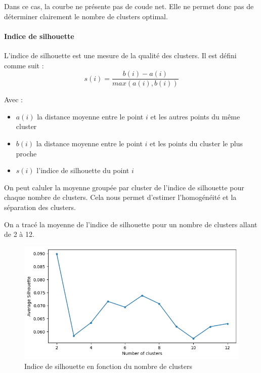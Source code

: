 \documentclass[french,a4paper,18pt]{article}
\begin{document}
Dans ce cas, la courbe ne présente pas de coude net. Elle ne permet donc pas de déterminer clairement le nombre de clusters optimal.

\paragraph{Indice de silhouette}

L'indice de silhouette est une mesure de la qualité des clusters.
Il est défini comme suit :
\begin{equation}
    s(i) = \frac{b(i) - a(i)}{max(a(i), b(i))}
    \label{eq:silhouette_i}
\end{equation}

Avec :
\begin{itemize}
    \item $a(i)$ la distance moyenne entre le point $i$ et les autres points du même cluster
    \item $b(i)$ la distance moyenne entre le point $i$ et les points du cluster le plus proche
    \item $s(i)$ l'indice de silhouette du point $i$
\end{itemize}

On peut caluler la moyenne groupée par cluster de l'indice de silhouette pour chaque nombre de clusters.
Cela nous permet d'estimer l'homogénéité et la séparation des clusters.

On a tracé la moyenne de l'indice de silhouette pour un nombre de clusters allant de 2 à 12.

\begin{figure}[h!]
    \centering
    \includegraphics[scale=0.4]{../images/mnist_kmeans_silhouette.png}
    \caption{Indice de silhouette en fonction du nombre de clusters}\label{fig:mnist_kmeans_silhouette}
\end{figure}
\end{document}
